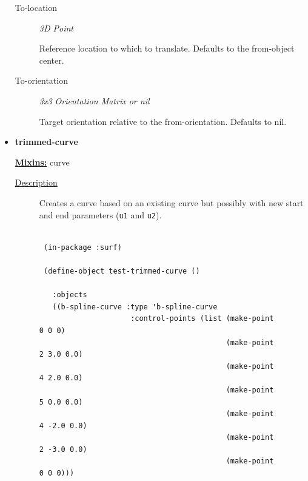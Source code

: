 \documentclass [11pt]{book}
\begin{document}
\begin{itemize}
\begin{description}
\item [To-location]
\emph{3D Point}

 Reference location to which to translate. Defaults to the from-object center.




\item [To-orientation]
\emph{3x3 Orientation Matrix or nil}

 Target orientation relative to the from-orientation. Defaults to nil.




\end{description}







\item {}
\label{prim:trimmed-curve}
\textbf{trimmed-curve}


\textbf{
\underline{Mixins:}} curve





\begin{description}

\item [
\underline{Description}]


Creates a curve based on an existing curve but possibly with new start and end parameters (\texttt{u1} and \texttt{u2}).



\end{description}




\begin{figure}
\begin{lrbox}{\boxedverb}
\begin{minipage}{\linewidth}
{\small

\begin{verbatim}
  
 (in-package :surf)

 (define-object test-trimmed-curve ()

   :objects
   ((b-spline-curve :type 'b-spline-curve
                     :control-points (list (make-point 0 0 0)
                                           (make-point 2 3.0 0.0) 
                                           (make-point 4 2.0 0.0) 
                                           (make-point 5 0.0 0.0) 
                                           (make-point 4 -2.0 0.0) 
                                           (make-point 2 -3.0 0.0) 
                                           (make-point 0 0 0)))
    

\end{verbatim}}
\end{minipage}
\end{lrbox}
\end{figure}
\end{itemize}
\end{document}
